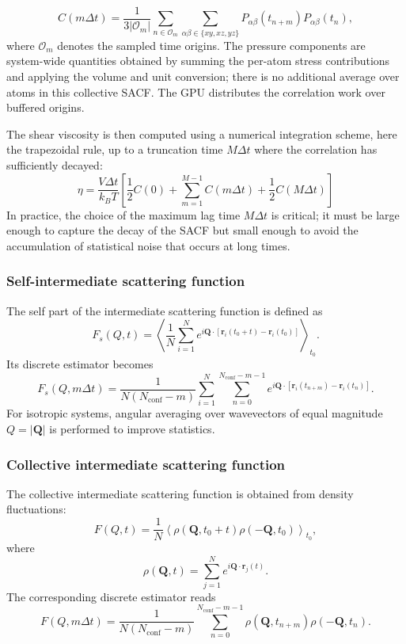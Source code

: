 \documentclass[final,1p,times]{elsarticle}
\begin{document}
\begin{equation}
C(m\Delta t)=\frac{1}{3|\mathcal O_m|}
\sum_{n\in\mathcal O_m}\sum_{\alpha\beta\in\{xy,xz,yz\}}
P_{\alpha\beta}(t_{n+m})P_{\alpha\beta}(t_n),
\end{equation}
where $\mathcal O_m$ denotes the sampled time origins. The pressure
components are system-wide quantities obtained by summing the per-atom
stress contributions and applying the volume and unit conversion;
there is no additional average over atoms in this collective SACF.
The GPU distributes the correlation work over buffered origins.

The shear viscosity is then computed using a numerical integration
scheme, here the trapezoidal rule, up to a truncation time $M
\Delta t$ where the correlation has sufficiently decayed: 
\begin{equation}
\eta = \frac{V \Delta t}{k_B T} \left[ \frac{1}{2} C(0) + \sum_{m=1}^{M-1} C(m \Delta t) + \frac{1}{2} C(M \Delta t) \right]
\end{equation}
In practice, the choice of the maximum lag time $M \Delta t$ is
critical; it must be large enough to capture the decay of the SACF but
small enough to avoid the accumulation of statistical noise that
occurs at long times. 


\subsubsection{Self-intermediate scattering function}
The self part of the intermediate scattering function is defined as
\[
F_s(Q,t)= \left\langle \frac{1}{N} \sum_{i=1}^{N} e^{i\mathbf{Q}\cdot [\mathbf{r}_i(t_0+t)-\mathbf{r}_i(t_0)]} \right\rangle_{t_0}.
\]
Its discrete estimator becomes
\[
F_s(Q,m\Delta t)= \frac{1}{N(N_{\mathrm{conf}}-m)} \sum_{i=1}^{N} \sum_{n=0}^{N_{\mathrm{conf}}-m-1} e^{i\mathbf{Q}\cdot [\mathbf{r}_i(t_{n+m})-\mathbf{r}_i(t_n)]}.
\]
For isotropic systems, angular averaging over wavevectors of equal magnitude $Q=|\mathbf{Q}|$ is performed to improve statistics.

\subsubsection{Collective intermediate scattering function}
The collective intermediate scattering function is obtained from density fluctuations:
\[
F(Q,t)= \frac{1}{N} \left\langle \rho(\mathbf{Q},t_0+t) \rho(-\mathbf{Q},t_0) \right\rangle_{t_0},
\]
where
\[
\rho(\mathbf{Q},t)= \sum_{j=1}^{N} e^{i\mathbf{Q}\cdot\mathbf{r}_j(t)}.
\]
The corresponding discrete estimator reads
\[
F(Q,m\Delta t)= \frac{1}{N(N_{\mathrm{conf}}-m)} \sum_{n=0}^{N_{\mathrm{conf}}-m-1} \rho(\mathbf{Q},t_{n+m}) \rho(-\mathbf{Q},t_n).
\]
\end{document}
